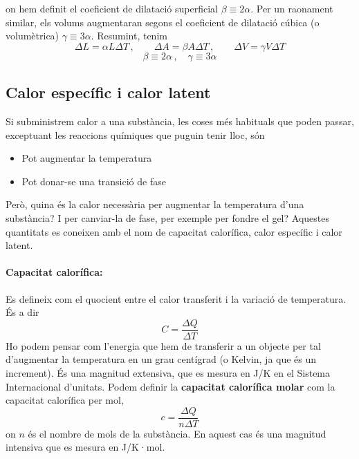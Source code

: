 \documentclass[12pt]{book}
\begin{document}
%
on hem definit el coeficient de dilatació superficial $\beta \equiv 2 \alpha $. Per un raonament similar, els volums augmentaran segons el coeficient de dilatació cúbica (o volumètrica) $\gamma \equiv 3 \alpha$. Resumint, tenim
%
\begin{equation}
    \boxed{\Delta L = \alpha L \Delta T\, , \qquad \Delta A = \beta A \Delta T\, , \qquad  \Delta V = \gamma V \Delta T }
\end{equation}
\begin{equation}
    \boxed{\beta \equiv 2 \alpha\, , \quad  \gamma \equiv 3 \alpha }
\end{equation}

\subsection{Calor específic i calor latent}

Si subministrem calor a una substància, les coses més habituals que poden passar, exceptuant les reaccions químiques que puguin tenir lloc, són 

\begin{itemize}
    \item Pot augmentar la temperatura
    \item Pot donar-se una transició de fase
\end{itemize}

Però, quina és la calor necessària per augmentar la temperatura d'una substància? I per canviar-la de fase, per exemple per fondre el gel? Aquestes quantitats es coneixen amb el nom de capacitat calorífica, calor específic i calor latent. 

\paragraph{Capacitat calorífica:} Es defineix com el quocient entre el calor transferit i la variació de temperatura. És a dir
%
\begin{equation}
    \boxed{C = \frac{\Delta Q}{\Delta T}}
\end{equation}
%
Ho podem pensar com l'energia que hem de transferir a un objecte per tal d'augmentar la temperatura en un grau centígrad (o Kelvin, ja que és un increment). És una magnitud extensiva, que es mesura en J/K en el Sistema Internacional d'unitats. Podem definir la {\bf capacitat calorífica molar} com la capacitat calorífica per mol,
%
\begin{equation}
    \boxed{c = \frac{\Delta Q}{n \Delta T}}
\end{equation}
%
on $n$ és el nombre de mols de la substància. En aquest cas és una magnitud intensiva que es mesura en J/K·mol.
\end{document}
